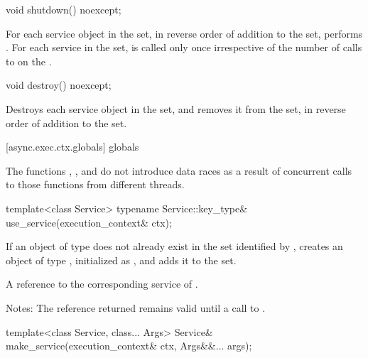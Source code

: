 %
\begin{itemdecl}
void shutdown() noexcept;
\end{itemdecl}

\begin{itemdescr}
\pnum
\effects For each service object  in the  set, in reverse order of addition to the set, performs . For each service in the set,  is called only once irrespective of the number of calls to  on the .
\end{itemdescr}

\begin{itemdecl}
void destroy() noexcept;
\end{itemdecl}

\begin{itemdescr}
\pnum
\effects Destroys each service object in the  set, and removes it from the set, in reverse order of addition to the set.
\end{itemdescr}



[async.exec.ctx.globals]{ globals}

\pnum
The functions , , and  do not introduce data races as a result of concurrent calls to those functions from different threads.

%
\begin{itemdecl}
template<class Service> typename Service::key_type&
  use_service(execution_context& ctx);
\end{itemdecl}

\begin{itemdescr}
\pnum
\effects If an object of type  does not already exist in the  set identified by , creates an object of type , initialized as , and adds it to the set.

\pnum
\returns A reference to the corresponding service of .

\pnum
Notes: The reference returned remains valid until a call to .
\end{itemdescr}

%
\begin{itemdecl}
template<class Service, class... Args> Service&
  make_service(execution_context& ctx, Args&&... args);
\end{itemdecl}


